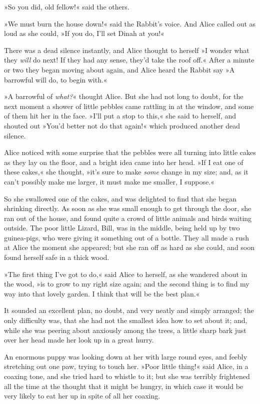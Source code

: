 »So you did, old fellow!« said the others.

»We must burn the house down!« said the Rabbit's voice. And Alice called out as loud as she could, »If you do, I'll set Dinah at you!«

There was a dead silence instantly, and Alice thought to herself »I wonder what they \textit{will} do next! If they had any sense, they'd take the roof off.« After a minute or two they began moving about again, and Alice heard the Rabbit say »A barrowful will do, to begin with.«

»A barrowful of \textit{what?}« thought Alice. But she had not long to doubt, for the next moment a shower of little pebbles came rattling in at the window, and some of them hit her in the face. »I'll put a stop to this,« she said to herself, and shouted out »You'd better not do that again!« which produced another dead silence.

Alice noticed with some surprise that the pebbles were all turning into little cakes as they lay on the floor, and a bright idea came into her head. »If I eat one of these cakes,« she thought, »it's sure to make \textit{some} change in my size; and, as it can't possibly make me larger, it must make me smaller, I suppose.«

So she swallowed one of the cakes, and was delighted to find that she began shrinking directly. As soon as she was small enough to get through the door, she ran out of the house, and found quite a crowd of little animals and birds waiting outside. The poor little Lizard, Bill, was in the middle, being held up by two guinea-pigs, who were giving it something out of a bottle. They all made a rush at Alice the moment she appeared; but she ran off as hard as she could, and soon found herself safe in a thick wood.

»The first thing I've got to do,« said Alice to herself, as she wandered about in the wood, »is to grow to my right size again; and the second thing is to find my way into that lovely garden. I think that will be the best plan.«

It sounded an excellent plan, no doubt, and very neatly and simply arranged; the only difficulty was, that she had not the smallest idea how to set about it; and, while she was peering about anxiously among the trees, a little sharp bark just over her head made her look up in a great hurry.

An enormous puppy was looking down at her with large round eyes, and feebly stretching out one paw, trying to touch her. »Poor little thing!« said Alice, in a coaxing tone, and she tried hard to whistle to it; but she was terribly frightened all the time at the thought that it might be hungry, in which case it would be very likely to eat her up in spite of all her coaxing.

